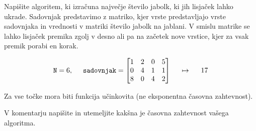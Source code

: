 \documentclass[arhiv]{../izpit}
\begin{document}
\podnaloga
  Napišite algoritem, ki izračuna največje število jabolk, ki jih lisjaček
  lahko ukrade. Sadovnjak predstavimo z matriko, kjer vrste predstavljajo
  vrste sadovnjaka in vrednosti v matriki število jabolk na jablani.
  V smislu matrike se lahko lisjaček premika zgolj v desno ali pa na začetek
  nove vrstice, kjer za vsak premik porabi en korak.

  \[
  {\texttt{N}}
  =
  6,
  \hspace{5mm}
  {\texttt{sadovnjak}}
  =
  \begin{bmatrix}
      1 & 2 & 0 & 5 \\
      0 & 4 & 1 & 1 \\
      8 & 0 & 4 & 2
  \end{bmatrix}
  \hspace{5mm}
  \mapsto
  \hspace{5mm}
  17
  \]

  Za vse točke mora biti funkcija učinkovita (ne eksponentna časovna
  zahtevnost).

  \podnaloga
  V komentarju napišite in utemeljite kakšna je časovna zahtevnost vašega algoritma.
\end{document}
